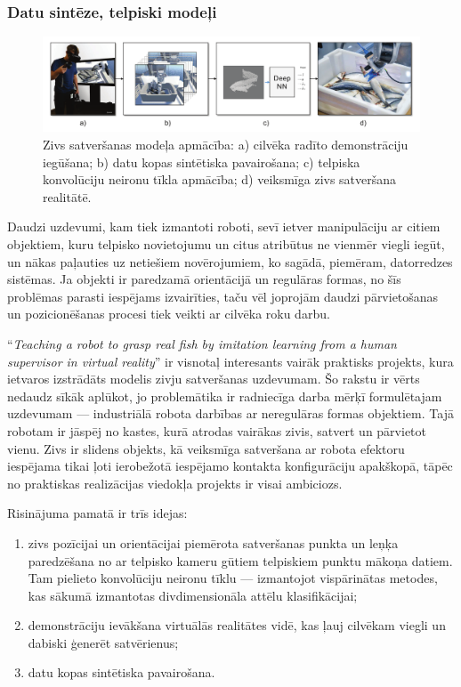 \documentclass[12pt, a4paper]{article}
\numberwithin{equation}{section} %
\begin{document}
\subsubsection{Datu sintēze, telpiski modeļi}

\begin{figure}[t!]
    \centering
    \includegraphics[width=16cm]{../img/fish.png}
    \caption{Zivs satveršanas modeļa apmācība: a) cilvēka radīto demonstrāciju iegūšana; b) datu kopas sintētiska pavairošana; c) telpiska konvolūciju neironu tīkla apmācība; d) veiksmīga zivs satveršana realitātē. \cite{dyrstad2018teaching}}
\end{figure}

Daudzi uzdevumi, kam tiek izmantoti roboti, sevī ietver manipulāciju ar citiem objektiem, kuru telpisko novietojumu un citus atribūtus ne vienmēr viegli iegūt, un nākas paļauties uz netiešiem novērojumiem, ko sagādā, piemēram, datorredzes sistēmas. Ja objekti ir paredzamā orientācijā un regulāras formas, no šīs problēmas parasti iespējams izvairīties, taču vēl joprojām daudzi pārvietošanas un pozicionēšanas procesi tiek veikti ar cilvēka roku darbu.

``\textit{Teaching a robot to grasp real fish by imitation learning from a human supervisor in virtual reality}'' \cite{dyrstad2018teaching} ir visnotaļ interesants vairāk praktisks projekts, kura ietvaros izstrādāts modelis zivju satveršanas uzdevumam. Šo rakstu ir vērts nedaudz sīkāk aplūkot, jo problemātika ir radniecīga darba mērķī formulētajam uzdevumam --- industriālā robota darbības ar neregulāras formas objektiem. Tajā robotam ir jāspēj no kastes, kurā atrodas vairākas zivis, satvert un pārvietot vienu. Zivs ir slidens objekts, kā veiksmīga satveršana ar robota efektoru iespējama tikai ļoti ierobežotā iespējamo kontakta konfigurāciju apakškopā, tāpēc no praktiskas realizācijas viedokļa projekts ir visai ambiciozs. 

Risinājuma pamatā ir trīs idejas:

\begin{enumerate}
    \item zivs pozīcijai un orientācijai piemērota satveršanas punkta un leņķa paredzēšana no ar telpisko kameru gūtiem telpiskiem punktu mākoņa datiem. Tam pielieto konvolūciju neironu tīklu --- izmantojot vispārinātas metodes, kas sākumā izmantotas divdimensionāla attēlu klasifikācijai;
    \item demonstrāciju ievākšana virtuālās realitātes vidē, kas ļauj cilvēkam viegli un dabiski ģenerēt satvērienus;
    \item datu kopas sintētiska pavairošana.
\end{enumerate}
\end{document}
